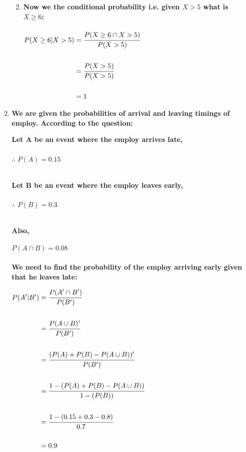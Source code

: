\documentclass{article}
\begin{document}
\begin{enumerate}
\begin{enumerate}
\newpage

\item \large \textbf{Now we the conditional probability i.e. given $X>5$ what is $X \geq 6$: }\\\\
$\begin{aligned}
P(X \geq 6 | X>5) &= \cfrac{P(X\geq6 \cap X>5)}{P(X>5)}\\\\
&= \cfrac{P(X>5)}{P(X>5)}\\\\
&= 1
\end{aligned}$
	
\end{enumerate}

\newpage

\item \large \textbf{We are given the probabilities of arrival and leaving timings of employ. According to the question: }

\textbf{Let A be an event where the employ arrives late,}\\\\
$\therefore$ $P(A) = 0.15$\\\

\textbf{Let B be an event where the employ leaves early,}\\\\
$\therefore$ $P(B) = 0.3$\\\

\textbf{Also,}\\\\
$P(A \cap B) = 0.08$\\\\

\textbf{We need to find the probability of the employ arriving early given that he leaves late: }

$\begin{aligned}
P(A' |  B') &= \cfrac{P(A' \cap B')}{P(B')}\\\\
&= \cfrac{P(A \cup B)'}{P(B')}\\\\
&= \cfrac{(P(A) + P(B) - P(A \cup B))'}{P(B')}\\\\
&= \cfrac{1-(P(A) + P(B) - P(A \cup B))}{1 - (P(B))}\\\\
&= \cfrac{1 - (0.15 + 0.3 - 0.8)}{0.7}\\\\
&= 0.9
\end{aligned}$


\end{enumerate}
\end{document}
